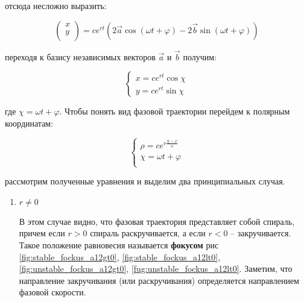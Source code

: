 \begin{enumerate}
  отсюда несложно выразить:

  \begin{equation}
    \begin{pmatrix}
      x \\ 
      y \\
    \end{pmatrix} = 
    c e^{r t} (2 \vec{a} \cos (\omega t + \varphi) - 2 \vec{b} \sin (\omega t + \varphi))
  \end{equation}

  переходя к базису независимых векторов $\vec{a}$ и $\vec{b}$ получим:

  \begin{equation}
    \begin{cases}
      x = c e^{r t} \cos {\chi} \\
      y = c e^{r t} \sin {\chi}
    \end{cases}
  \end{equation}
  
  где $\chi = \omega t + \varphi$. Чтобы понять вид фазовой траектории перейдем к полярным координатам:

  \begin{equation}
    \begin{cases}
      \rho = c e^{r \frac{\chi - \varphi}{\omega}} \\
      \chi = \omega t + \varphi \\
    \end{cases}
  \end{equation}

  рассмотрим полученные уравнения и выделим два принципиальных случая.

  \begin{enumerate}
    \item $r \neq 0$
    
    В этом случае видно, что фазовая траектория представляет собой спираль, причем если $r > 0$ спираль раскручивается, а если $r < 0$ -- закручивается. Такое положение равновесия называется \textbf{фокусом} рис \ref{fig:stable_fockus_a12gt0}, \ref{fig:stable_fockus_a12lt0}, \ref{fig:unstable_fockus_a12gt0}, \ref{fug:unstable_fockus_a12lt0}. Заметим, что направление закручивания (или раскручивания) определяется направлением фазовой скорости.


\end{enumerate}
\end{enumerate}
